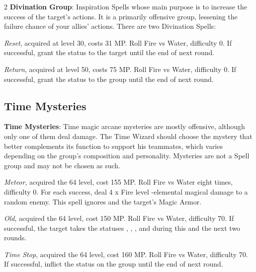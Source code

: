 \begin{multicols}{2}
    \textbf{Divination Group}: Inspiration Spells whose main purpose is to increase the success of the target’s actions. It is a primarily offensive group, lessening the failure chance of your allies’ actions. There are two Divination Spells:
    
    \textit{Reset}, acquired at level 30, costs 31 MP\@. Roll Fire vs Water, difficulty 0. If successful, grant the  status to the target until the end of next round.
    
    \textit{Return}, acquired at level 50, costs 75 MP\@. Roll Fire vs Water, difficulty 0. If successful, grant the  status to the group until the end of next round.
    
    \subsection{Time Mysteries}\label{subsec:time-mysteries}

    \textbf{Time Mysteries}: Time magic arcane mysteries are mostly offensive, although only one of them deal damage. The Time Wizard should choose the mystery that better complements its function to support his teammates, which varies depending on the group’s composition and personality. Mysteries are not a Spell group and may not be chosen as such.
    
    \textit{Meteor}, acquired the 64 level, cost 155 MP\@. Roll Fire vs Water eight times, difficulty 0. For each success, deal 4 x Fire level -elemental magical damage to a random enemy. This spell ignores  and the target’s Magic Armor.
    
    \textit{Old}, acquired the 64 level, cost 150 MP\@. Roll Fire vs Water, difficulty 70. If successful, the target takes the statuses , , ,  and  during this and the next two rounds.
    
    \textit{Time Stop}, acquired the 64 level, cost 160 MP\@. Roll Fire vs Water, difficulty 70. If successful, inflict the  status on the group until the end of next round.

\end{multicols}

